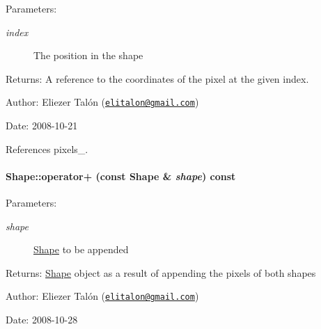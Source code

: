 \begin{Desc}
\item[Parameters:]
\begin{description}
\item[{\em index}]The position in the shape\end{description}
\end{Desc}
\begin{Desc}
\item[Returns:]A reference to the coordinates of the pixel at the given index.\end{Desc}
\begin{Desc}
\item[Author:]Eliezer Talón (\href{mailto:elitalon@gmail.com}{\tt elitalon@gmail.com}) \end{Desc}
\begin{Desc}
\item[Date:]2008-10-21 \end{Desc}


References pixels\_\-.\hypertarget{class_shape_4e1517d6e14471df4750bc241f517b4e}{
\paragraph[operator+]{ Shape::operator+ (const {\bf Shape} \& {\em shape}) const}\hfill}
\label{class_shape_4e1517d6e14471df4750bc241f517b4e}


\begin{Desc}
\item[Parameters:]
\begin{description}
\item[{\em shape}]\hyperlink{class_shape}{Shape} to be appended\end{description}
\end{Desc}
\begin{Desc}
\item[Returns:]\hyperlink{class_shape}{Shape} object as a result of appending the pixels of both shapes\end{Desc}
\begin{Desc}
\item[Author:]Eliezer Talón (\href{mailto:elitalon@gmail.com}{\tt elitalon@gmail.com}) \end{Desc}
\begin{Desc}
\item[Date:]2008-10-28 \end{Desc}


